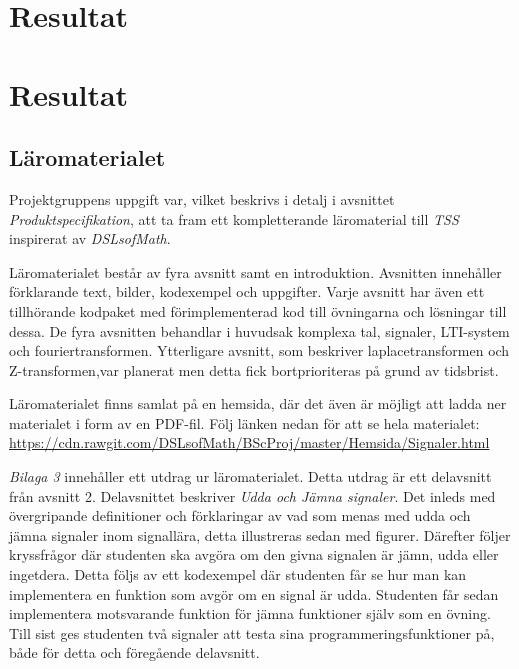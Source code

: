 \documentclass[]{article}
\begin{document}
\section{Resultat}


%

\section{Resultat}


%

\subsection{Läromaterialet}
Projektgruppens uppgift var, vilket beskrivs i detalj i avsnittet \textit{Produktspecifikation}, att ta fram ett kompletterande
läromaterial till \textit{TSS} inspirerat av \textit{DSLsofMath}.

Läromaterialet består av fyra avsnitt samt en introduktion. Avsnitten innehåller förklarande text, bilder, kodexempel
och uppgifter. Varje avsnitt har även ett tillhörande kodpaket med förimplementerad kod till övningarna och lösningar
till dessa. De fyra avsnitten behandlar i huvudsak komplexa tal, signaler, LTI-system och fouriertransformen.
Ytterligare avsnitt, som beskriver laplacetransformen och Z-transformen,var planerat men detta fick bortprioriteras på
grund av tidsbrist.

Läromaterialet finns samlat på en hemsida, där det även är möjligt att ladda ner materialet i form av en PDF-fil. Följ
länken nedan för att se hela materialet:
\url{https://cdn.rawgit.com/DSLsofMath/BScProj/master/Hemsida/Signaler.html}

\textit{Bilaga 3} innehåller ett utdrag ur läromaterialet. Detta utdrag är ett delavsnitt från avsnitt 2. Delavsnittet
beskriver \textit{Udda och Jämna signaler}. Det inleds med övergripande definitioner och förklaringar av vad som menas med udda
och jämna signaler inom signallära, detta illustreras sedan med figurer. Därefter följer kryssfrågor där studenten ska
avgöra om den givna signalen är jämn, udda eller ingetdera. Detta följs av ett kodexempel där studenten får se hur man
kan implementera en funktion som avgör om en signal är udda. Studenten får sedan implementera motsvarande funktion för
jämna funktioner själv som en övning. Till sist ges studenten två signaler att testa sina programmeringsfunktioner på,
både för detta och föregående delavsnitt.
\end{document}
